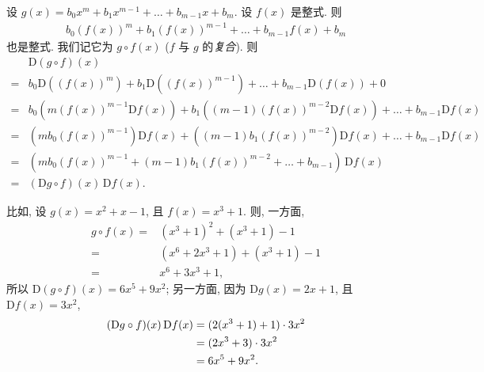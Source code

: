 \documentclass[../libro.tex]{subfiles}
\begin{document}
\begin{example}
    设 \(g(x)
    = b_0 x^m + b_1 x^{m-1} + \dots + b_{m-1} x + b_m\).
    设 \(f(x)\) 是整式.
    则
    \begin{align*}
        b_0 (f(x))^m + b_1 (f(x))^{m-1} + \dots
        + b_{m-1} f(x) + b_m
    \end{align*}
    也是整式.
    我们记它为 \(g \circ f (x)\)
    (\(f\) 与 \(g\) 的\emph{复合}).
    则
    \begin{align*}
        &
        \mathrm{D} (g \circ f) (x)
        \\
        = {} &
        b_0 \mathrm{D} ((f(x))^m)
        + b_1 \mathrm{D} ((f(x))^{m-1})
        + \dots
        + b_{m-1} \mathrm{D} (f(x))
        + 0
        \\
        = {} &
        b_0 (m (f(x))^{m-1} \mathrm{D} f(x))
        + b_1 ((m-1) (f(x))^{m-2} \mathrm{D} f(x))
        + \dots
        + b_{m-1} \mathrm{D} f(x)
        \\
        = {} &
        (m b_0 (f(x))^{m-1}) \mathrm{D} f(x)
        + ((m-1) b_1 (f(x))^{m-2}) \mathrm{D} f(x)
        + \dots
        + b_{m-1} \mathrm{D} f(x)
        \\
        = {} &
        (m b_0 (f(x))^{m-1} + (m-1) b_1 (f(x))^{m-2}
        + \dots + b_{m-1})\,
        \mathrm{D} f(x)
        \\
        = {} &
        (\mathrm{D}g \circ f) (x)\,
        \mathrm{D} f(x).
    \end{align*}

    比如, 设 \(g(x) = x^2 + x - 1\),
    且 \(f(x) = x^3 + 1\).
    则, 一方面,
    \begin{align*}
        g \circ f (x)
        = {} &
        (x^3 + 1)^2 + (x^3 + 1) - 1
        \\
        = {} &
        (x^6 + 2 x^3 + 1) + (x^3 + 1) - 1
        \\
        = {} &
        x^6 + 3 x^3 + 1,
    \end{align*}
    所以
    \(\mathrm{D} (g \circ f) (x) = 6 x^5 + 9 x^2\);
    另一方面,
    因为 \(\mathrm{D} g(x) = 2 x + 1\),
    且 \(\mathrm{D} f(x) = 3 x^2\),
    \begin{align*}
        (\mathrm{D}g \circ f) (x)\,
        \mathrm{D} f(x)
        = {} &
        (2 (x^3 + 1) + 1) \cdot 3 x^2
        \\
        = {} &
        (2 x^3 + 3) \cdot 3 x^2
        \\
        = {} &
        6 x^5 + 9 x^2.
        \qedhere
    \end{align*}
\end{example}
\end{document}
